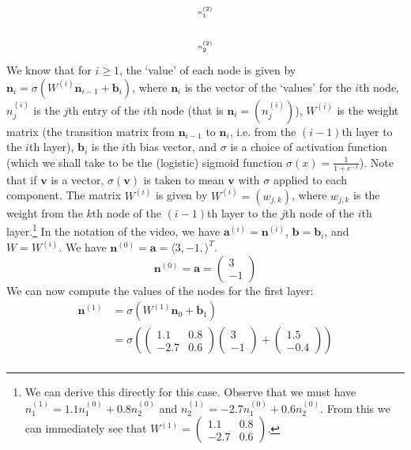 \documentclass[11pt,letterpaper]{article}
\begin{document}
\begin{enumerate}[(a)]
\[\begin{tikzpicture}[scale=1.1]
		\node at (4,1.2) {\tiny$n^{(2)}_1$};
		\node at (4,0.2) {\tiny$n^{(2)}_2$};
		\end{tikzpicture}
		\]
We know that for $i \geq 1$, the `value' of each node is given by $\mathbf{n}_i= \sigma(W^{(i)} \mathbf{n}_{i-1} + \mathbf{b}_i)$, where $\mathbf{n}_i$ is the vector of the `values' for the $i$th node, $n^{(i)}_j$ is the $j$th entry of the $i$th node (that is $\mathbf{n}_i= (n^{(i)}_j)$), $W^{(i)}$ is the weight matrix (the transition matrix from $\mathbf{n}_{i-1}$ to $\mathbf{n}_i$, i.e. from the $(i-1)$th layer to the $i$th layer), $\mathbf{b}_i$ is the $i$th bias vector, and $\sigma$ is a choice of activation function (which we shall take to be the (logistic) sigmoid function $\sigma(x)= \frac{1}{1 + e^{-x}}$). Note that if $\mathbf{v}$ is a vector, $\sigma(\mathbf{v})$ is taken to mean $\mathbf{v}$ with $\sigma$ applied to each component. The matrix $W^{(i)}$ is given by $W^{(i)}= (w_{j,k})$, where $w_{j,k}$ is the weight from the $k$th node of the $(i-1)$th layer to the $j$th node of the $i$th layer.\footnote{We can derive this directly for this case. Observe that we must have $n^{(1)}_1= 1.1n^{(0)}_1 + 0.8n^{(0)}_2$ and $n^{(1)}_2= -2.7n^{(0)}_1 + 0.6n^{(0)}_2$. From this we can immediately see that $W^{(1)}= \begin{pmatrix} 1.1 & 0.8 \\ -2.7 & 0.6 \end{pmatrix}$.} In the notation of the video, we have $\mathbf{a}^{(i)}= \mathbf{n}^{(i)}$, $\mathbf{b}= \mathbf{b}_i$, and $W= W^{(i)}$. We have $\mathbf{n}^{(0)}= \mathbf{a}= \langle 3, -1, \rangle^T$. 
	\[
	\mathbf{n}^{(0)}= \mathbf{a}= \begin{pmatrix} 3 \\ -1 \end{pmatrix}
	\]
We can now compute the values of the nodes for the first layer:
	\[
	\begin{aligned}
	\mathbf{n}^{(1)}&= \sigma(W^{(1)} \mathbf{n}_0 + \mathbf{b}_1) \\[0.3cm]
	&= \sigma \left( 
	\begin{pmatrix} 
	1.1 & 0.8 \\
	-2.7 & 0.6
	\end{pmatrix}
	\begin{pmatrix} 3 \\ -1 \end{pmatrix} + \begin{pmatrix} 1.5 \\ -0.4 \end{pmatrix}
	\right) \\[0.3cm]

\end{aligned}\]
\end{enumerate}
\end{document}

